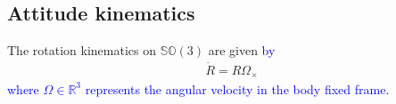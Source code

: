 \documentclass{article}
\newcommand{\SOthree}{\mathbb{SO}(3)}
\newcommand{\R}[1]{\mathbb{R}^{#1}}
\newcommand{\dotR}{\dot{R}}
\newcommand{\Omegay}{\Omega^y}
\newtheorem{assumption}{Assumption}
\newtheorem{definition}{Definition}
\newtheorem{proposition}{Proposition}
\newcommand{\textblue}[1]{\textcolor{blue}{#1}}
\newcommand{\normSOthree}[1]{{{\vert}#1 {\vert}_I}}
\newcommand{\cross}[1]{{#1}_\times}
\newcommand{\neighbourhood}[2]{\mathcal{N}_{#1}(#2)}
\begin{document}




\subsection{Attitude kinematics}
The rotation kinematics on $\SOthree$ are given \textblue{by}  
\begin{align}\label{eq:rotationKinematics}
    \dotR = R\cross{\Omega}
\end{align}
\textblue{where $\Omega\in\R{3}$ represents the angular velocity in the body fixed frame.}
\end{document}
